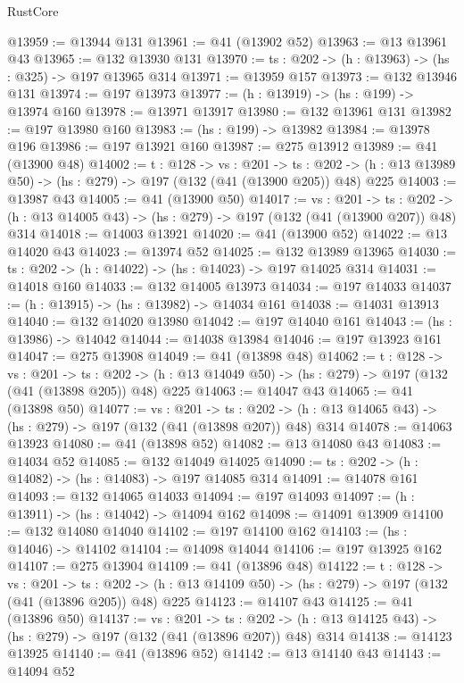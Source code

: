 \begin{lexlean}{RustCore}
\begin{coremodule}
@13959 := @13944 @131
@13961 := @41 (@13902 @52)
@13963 := @13 @13961 @43
@13965 := @132 @13930 @131
@13970 := {ts : @202} -> (h : @13963) -> (hs : @325) -> @197 @13965 @314
@13971 := @13959 @157
@13973 := @132 @13946 @131
@13974 := @197 @13973
@13977 := (h : @13919) -> (hs : @199) -> @13974 @160
@13978 := @13971 @13917
@13980 := @132 @13961 @131
@13982 := @197 @13980 @160
@13983 := (hs : @199) -> @13982
@13984 := @13978 @196
@13986 := @197 @13921 @160
@13987 := @275 @13912
@13989 := @41 (@13900 @48)
@14002 := {t : @128} ->
  {vs : @201} ->
  {ts : @202} -> (h : @13 @13989 @50) -> (hs : @279) -> @197 (@132 (@41 (@13900 @205)) @48) @225
@14003 := @13987 @43
@14005 := @41 (@13900 @50)
@14017 := {vs : @201} ->
  {ts : @202} -> (h : @13 @14005 @43) -> (hs : @279) -> @197 (@132 (@41 (@13900 @207)) @48) @314
@14018 := @14003 @13921
@14020 := @41 (@13900 @52)
@14022 := @13 @14020 @43
@14023 := @13974 @52
@14025 := @132 @13989 @13965
@14030 := {ts : @202} -> (h : @14022) -> (hs : @14023) -> @197 @14025 @314
@14031 := @14018 @160
@14033 := @132 @14005 @13973
@14034 := @197 @14033
@14037 := (h : @13915) -> (hs : @13982) -> @14034 @161
@14038 := @14031 @13913
@14040 := @132 @14020 @13980
@14042 := @197 @14040 @161
@14043 := (hs : @13986) -> @14042
@14044 := @14038 @13984
@14046 := @197 @13923 @161
@14047 := @275 @13908
@14049 := @41 (@13898 @48)
@14062 := {t : @128} ->
  {vs : @201} ->
  {ts : @202} -> (h : @13 @14049 @50) -> (hs : @279) -> @197 (@132 (@41 (@13898 @205)) @48) @225
@14063 := @14047 @43
@14065 := @41 (@13898 @50)
@14077 := {vs : @201} ->
  {ts : @202} -> (h : @13 @14065 @43) -> (hs : @279) -> @197 (@132 (@41 (@13898 @207)) @48) @314
@14078 := @14063 @13923
@14080 := @41 (@13898 @52)
@14082 := @13 @14080 @43
@14083 := @14034 @52
@14085 := @132 @14049 @14025
@14090 := {ts : @202} -> (h : @14082) -> (hs : @14083) -> @197 @14085 @314
@14091 := @14078 @161
@14093 := @132 @14065 @14033
@14094 := @197 @14093
@14097 := (h : @13911) -> (hs : @14042) -> @14094 @162
@14098 := @14091 @13909
@14100 := @132 @14080 @14040
@14102 := @197 @14100 @162
@14103 := (hs : @14046) -> @14102
@14104 := @14098 @14044
@14106 := @197 @13925 @162
@14107 := @275 @13904
@14109 := @41 (@13896 @48)
@14122 := {t : @128} ->
  {vs : @201} ->
  {ts : @202} -> (h : @13 @14109 @50) -> (hs : @279) -> @197 (@132 (@41 (@13896 @205)) @48) @225
@14123 := @14107 @43
@14125 := @41 (@13896 @50)
@14137 := {vs : @201} ->
  {ts : @202} -> (h : @13 @14125 @43) -> (hs : @279) -> @197 (@132 (@41 (@13896 @207)) @48) @314
@14138 := @14123 @13925
@14140 := @41 (@13896 @52)
@14142 := @13 @14140 @43
@14143 := @14094 @52

\end{coremodule}
\end{lexlean}
